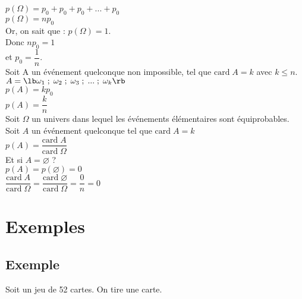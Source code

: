 $p\left(\Omega\right) = p_0 + p_0 + p_0 + ... + p_0 $ \\

$p\left(\Omega\right) = np_0$ \\

Or, on sait que : $p\left(\Omega\right) = 1$. \\

Donc $np_0 = 1 $ \\

et $ p_0 = \dfrac{1}{n} $. \\

Soit A un événement quelconque non impossible, tel que $\mathrm{card} \; A = k$ avec $k \leqslant n$. \\

$A = \lb \omega_1 \; ; \;  \omega_2 \; ; \; \omega_3 \; ; \; ... \; ; \; \omega_k \rb $ \\

$p\left(A\right) = kp_0$ \\

$ p\left(A\right) = \dfrac{k}{n} $ \\

Soit $\Omega$ un univers dans lequel les événements élémentaires sont équiprobables. \\ Soit $A$ un événement quelconque tel que $\mathrm{card} \;  A = k$  \\

$ p\left(A\right) = \dfrac{\mathrm{card} \; A}{\mathrm{card} \; \Omega} $ \\

Et si $ A = \varnothing $ ? \\ 

$ p \left(A\right) = p \left(\varnothing\right) = 0 $ \\

$\dfrac{\mathrm{card} \; A}{\mathrm{card} \; \Omega} = \dfrac{\mathrm{card} \; \varnothing }{\mathrm{card} \; \Omega} = \dfrac{0}{n} = 0 $ \\

\newpage

\section{Exemples}

\subsection{Exemple }

Soit un jeu de 52 cartes. On tire une carte.

